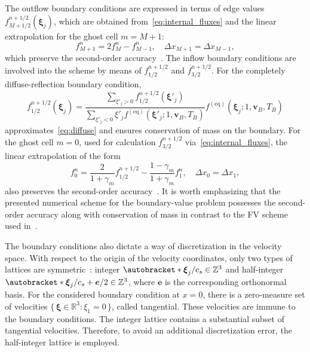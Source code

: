 \documentclass{elsarticle} %
\newcommand{\Set}[2]{\{\,{#1}:{#2}\,\}}
\DeclarePairedDelimiter\autobracket()       %
\newcommand{\br}[1]{\autobracket*{#1}}
\newcommand{\bxi}{\boldsymbol{\xi}}
\newcommand{\bv}{\boldsymbol{v}}
\newcommand{\be}{\boldsymbol{e}}
\newcommand{\equil}[1]{#1^\mathrm{(eq)}}
\begin{document}
The outflow boundary conditions are expressed in terms of edge values \(f^{n+1/2}_{M+1/2}(\bxi_j)\),
which are obtained from~\eqref{eq:internal_fluxes}
and the linear extrapolation for the ghost cell \(m=M+1\):
\begin{equation}\label{eq:last_ghost}
    f^n_{M+1} = 2f^n_M - f^n_{M-1}, \quad \Delta{x}_{M+1} = \Delta{x}_{M-1},
\end{equation}
which preserve the second-order accuracy~\cite{LeVeque2002}.
The inflow boundary conditions are involved into the scheme
by means of \(f^{n+1/2}_{1/2}\) and \(f^{n+1/2}_{3/2}\).
For the completely diffuse-reflection boundary condition,
\begin{equation}\label{eq:first_flux}
    f^{n+1/2}_{1/2}(\bxi_j) = \displaystyle\frac{\sum_{\xi'_j>0}f^{n+1/2}_{1/2}(\bxi'_j)}
        {\sum_{\xi'_j<0}\xi'_j\equil{f}(\bxi'_j; 1, \bv_B, T_B)}
        \equil{f}(\bxi_j; 1, \bv_B, T_B)
\end{equation}
approximates~\eqref{eq:diffuse} and ensures conservation of mass on the boundary.
For the ghost cell \(m=0\), used for calculation \(f^{n+1/2}_{3/2}\) via~\eqref{eq:internal_fluxes},
the linear extrapolation of the form
\begin{equation}\label{eq:first_ghost}
    f^n_0 = \frac2{1+\gamma_m}f^{n+1/2}_{1/2} - \frac{1-\gamma_m}{1+\gamma_m}f^n_1, \quad
    \Delta{x}_0 = \Delta{x}_1,
\end{equation}
also preserves the second-order accuracy~\cite{LeVeque2002}.
It is worth emphasizing that the presented numerical scheme for the boundary-value problem
possesses the second-order accuracy along with conservation of mass
in contrast to the FV scheme used in~\cite{Baranger2019}.

The boundary conditions also dictate a way of discretization in the velocity space.
With respect to the origin of the velocity coordinates, only two types of lattices are symmetric~\cite{Inamuro1990}:
integer \(\br{\bxi_j/c_s} \in \mathbb{Z}^3\) and half-integer \(\br{\bxi_j/c_s + \be/2} \in \mathbb{Z}^3\),
where \(\be\) is the corresponding orthonormal basis.
For the considered boundary condition at \(x=0\), there is a zero-measure set of velocities
\(\Set{\bxi\in\mathbb{R}^3}{\xi_1=0}\), called tangential.
These velocities are immune to the boundary conditions.
The integer lattice contains a substantial subset of tangential velocities.
Therefore, to avoid an additional discretization error, the half-integer lattice is employed.
\end{document}
